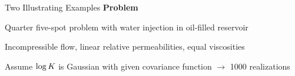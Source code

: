 \def\name{Two Illustrating Examples}

\begin{frame}{\name{}}
    \textbf{Problem}
    \begin{squarelist}
        \item Quarter five-spot problem with water injection in oil-filled reservoir
        \item Incompressible flow, linear relative permeabilities, equal viscosities
        \item Assume $\log K$ is Gaussian with given covariance function $\rightarrow$ 1000 realizations
    \end{squarelist}
\end{frame}

\def\name{Example 1: Smoothly Permeability}

